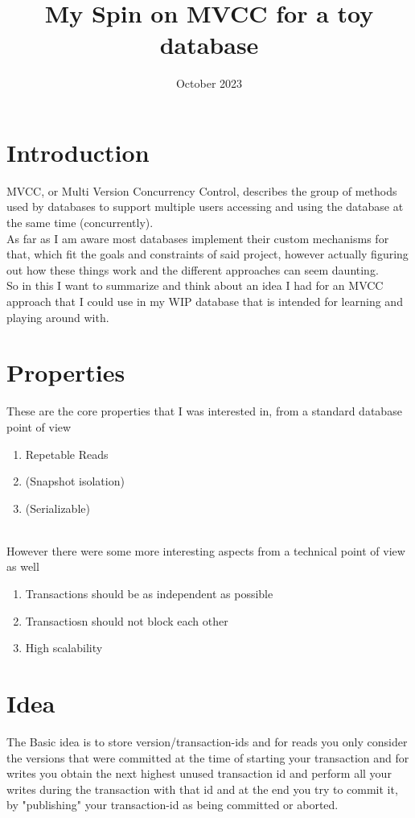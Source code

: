 \documentclass[a4paper, 11pt]{article}
\title{My Spin on MVCC for a toy database}
\date{October 2023}
\begin{document}
\section{Introduction}
MVCC, or Multi Version Concurrency Control, describes the group of methods used by databases to support multiple
users accessing and using the database at the same time (concurrently). \\
As far as I am aware most databases implement their custom mechanisms for that, which fit the goals and constraints
of said project, however actually figuring out how these things work and the different approaches can seem daunting. \\
So in this I want to summarize and think about an idea I had for an MVCC approach that I could use in my WIP database
that is intended for learning and playing around with.

\section{Properties}
These are the core properties that I was interested in, from a standard database point of view
\begin{enumerate}
\item Repetable Reads
\item (Snapshot isolation)
\item (Serializable)
\end{enumerate} \\
However there were some more interesting aspects from a technical point of view as well
\begin{enumerate}
\item Transactions should be as independent as possible
\item Transactiosn should not block each other
\item High scalability
\end{enumerate}

\section{Idea}
The Basic idea is to store version/transaction-ids and for reads you only consider the versions that were committed at
the time of starting your transaction and for writes you obtain the next highest unused transaction id and perform all
your writes during the transaction with that id and at the end you try to commit it, by "publishing" your transaction-id
as being committed or aborted.
\end{document}

